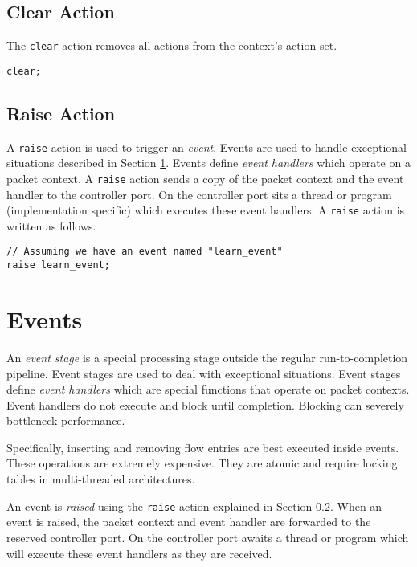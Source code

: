 \subsection{Clear Action} \label{tut:clear_action}

The \texttt{clear} action removes all actions from the context's action set.

\begin{lstlisting}
clear;
\end{lstlisting}

\subsection{Raise Action} \label{tut:raise_action}

A \texttt{raise} action is used to trigger an \textit{event}. Events are used to
handle exceptional situations described in Section \ref{tut:event}. Events
define \textit{event handlers} which operate on a packet context. A \texttt{raise} action
sends a copy of the packet context and the event handler to the controller port.
On the controller port sits a thread or program (implementation specific) which
executes these event handlers. A \texttt{raise} action is written as follows.

\begin{lstlisting}
// Assuming we have an event named "learn_event"
raise learn_event;
\end{lstlisting}

\section{Events} \label{tut:event}

An \textit{event stage} is a special processing stage outside the regular
run-to-completion pipeline. Event stages are used to deal with exceptional
situations. Event stages define \textit{event handlers} which are special
functions that operate on packet contexts. Event handlers do not execute and
block until completion. Blocking can severely bottleneck performance.

Specifically, inserting and removing flow entries are best executed inside
events. These operations are extremely expensive. They are atomic and require
locking tables in multi-threaded architectures.

An event is \textit{raised} using the \texttt{raise} action explained in Section
\ref{tut:raise_action}. When an event is raised, the packet context and event
handler are forwarded to the reserved controller port. On the controller port
awaits a thread or program which will execute these event handlers as they are
received.


